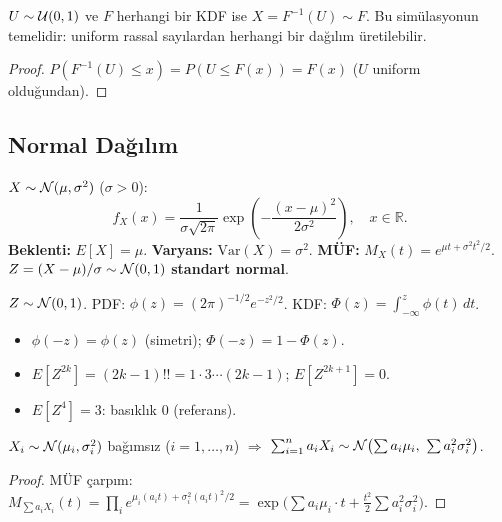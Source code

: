 \begin{onerme}
\label{prop:quantile}
$U \sim \mathcal{U}(0,1)$ ve $F$ herhangi bir KDF ise $X = F^{-1}(U) \sim F$.
Bu simülasyonun temelidir: uniform rassal sayılardan herhangi bir dağılım üretilebilir.
\end{onerme}

\begin{proof}
$P(F^{-1}(U) \leq x) = P(U \leq F(x)) = F(x)$ ($U$ uniform olduğundan).
\end{proof}

\subsection{Normal Dağılım}
\label{subsec:normal}

\begin{tanim}
\label{def:normal}
$X \sim \mathcal{N}(\mu, \sigma^2)$ ($\sigma > 0$):
\[
  f_X(x) = \frac{1}{\sigma\sqrt{2\pi}} \exp\!\left(-\frac{(x-\mu)^2}{2\sigma^2}\right), \quad x \in \mathbb{R}.
\]
\textbf{Beklenti:} $E[X] = \mu$. \quad
\textbf{Varyans:} $\mathrm{Var}(X) = \sigma^2$. \quad
\textbf{MÜF:} $M_X(t) = e^{\mu t + \sigma^2 t^2/2}$.\\
$Z = (X-\mu)/\sigma \sim \mathcal{N}(0,1)$ \textbf{standart normal}.
\end{tanim}

\begin{onerme}
$Z \sim \mathcal{N}(0,1)$. PDF: $\phi(z) = (2\pi)^{-1/2} e^{-z^2/2}$. KDF: $\Phi(z) = \int_{-\infty}^z \phi(t)\,dt$.
\begin{itemize}
  \item $\phi(-z) = \phi(z)$ (simetri); $\Phi(-z) = 1 - \Phi(z)$.
  \item $E[Z^{2k}] = (2k-1)!! = 1 \cdot 3 \cdots (2k-1)$; $E[Z^{2k+1}] = 0$.
  \item $E[Z^4] = 3$: basıklık 0 (referans).
\end{itemize}
\end{onerme}

\begin{teorem}
\label{thm:normal_yeniden}
$X_i \sim \mathcal{N}(\mu_i, \sigma_i^2)$ bağımsız ($i=1,\ldots,n$) $\Rightarrow$
$\sum_{i=1}^n a_i X_i \sim \mathcal{N}\!\left(\sum a_i\mu_i,\ \sum a_i^2\sigma_i^2\right)$.
\end{teorem}

\begin{proof}
MÜF çarpım: $M_{\sum a_i X_i}(t) = \prod_i e^{\mu_i(a_i t) + \sigma_i^2(a_i t)^2/2}
= \exp\!\bigl(\sum a_i\mu_i \cdot t + \tfrac{t^2}{2}\sum a_i^2\sigma_i^2\bigr)$.
\end{proof}

